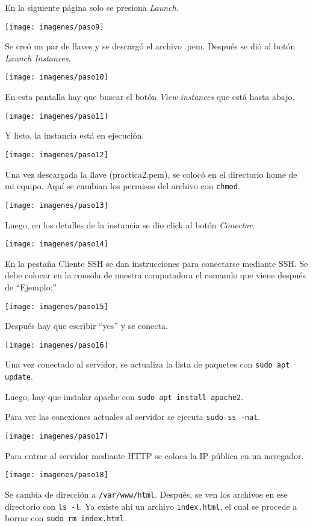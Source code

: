 \documentclass{article}
\begin{document}
En la siguiente página solo se presiona \textit{Launch}.

\texttt{[image: imagenes/paso9]}

Se creó un par de llaves y se descargó el archivo .pem. Después se dió al botón \textit{Launch Instances}.

\texttt{[image: imagenes/paso10]}

En esta pantalla hay que buscar el botón \textit{View instances} que está hasta abajo.

\texttt{[image: imagenes/paso11]}

Y listo, la instancia está en ejecución.

\texttt{[image: imagenes/paso12]}

Una vez descargada la llave (practica2.pem), se colocó en el directorio home de mi equipo. Aquí se cambian los permisos del archivo con \texttt{chmod}.

\texttt{[image: imagenes/paso13]}

Luego, en los detalles de la instancia se dio click al botón \textit{Conectar}.

\texttt{[image: imagenes/paso14]}

En la pestaña Cliente SSH se dan instrucciones para conectarse mediante SSH. Se debe colocar en la consola de nuestra computadora el comando que viene después de ``Ejemplo:''

\texttt{[image: imagenes/paso15]}

Después hay que escribir ``yes'' y se conecta.

\texttt{[image: imagenes/paso16]}

Una vez conectado al servidor, se actualiza la lista de paquetes con \texttt{sudo apt update}.

Luego, hay que instalar apache con \texttt{sudo apt install apache2}.

Para ver las conexiones actuales al servidor se ejecuta \texttt{sudo ss -nat}.

\texttt{[image: imagenes/paso17]}

Para entrar al servidor mediante HTTP se coloca la IP pública en un navegador.

\texttt{[image: imagenes/paso18]}

Se cambia de dirección a \texttt{/var/www/html}. Después, se ven los archivos en ese directorio con \texttt{ls -l}. Ya existe ahí un archivo \texttt{index.html}, el cual se procede a borrar con \texttt{sudo rm index.html}.
\end{document}
